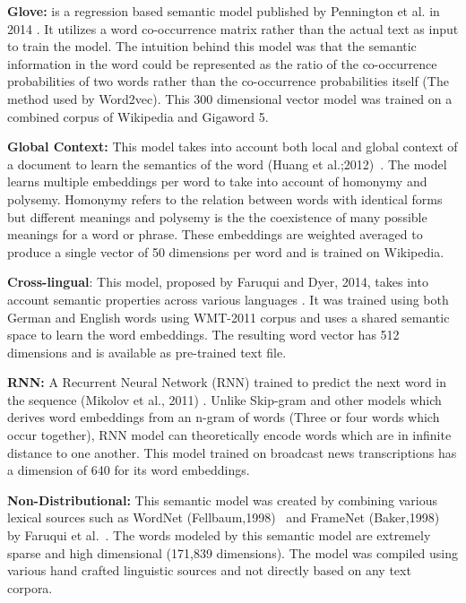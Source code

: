 \noindent \textbf{Glove:} is a regression based semantic model published by Pennington et al. in 2014 \cite{Glove}. It utilizes a word co-occurrence matrix rather than the actual text as input to train the model.  The intuition behind this model was that the semantic information in the word could be represented as the ratio of the co-occurrence probabilities of two words rather
than the co-occurrence probabilities itself (The method used by Word2vec). This  300 dimensional vector model was trained on a combined corpus of Wikipedia and Gigaword 5.

\noindent \textbf{Global Context:} This model takes into account both local
and global context of a document to learn the semantics of the word (Huang et al.;2012)~\cite{GlobalContext}. The model learns multiple embeddings per word to take into account of homonymy  and polysemy. Homonymy refers to the relation between words with identical forms but different meanings and polysemy is the the coexistence of many possible meanings for a
word or phrase. These embeddings are weighted averaged to produce a single vector of 50 dimensions per word and is trained on Wikipedia.


\noindent \textbf{Cross-lingual}: This model, proposed by Faruqui
and Dyer, 2014, takes into account semantic
properties across various languages \cite{Crosslingual}. It was trained using both German and English words using WMT-2011 corpus and uses a shared semantic space to learn the word embeddings. The resulting word vector
has 512 dimensions and is available as pre-trained text file.

\noindent \textbf{RNN:} A Recurrent Neural Network (RNN) trained  to predict the next word in the sequence (Mikolov et
al., 2011) \cite{RNN}. Unlike Skip-gram and other models which derives word
embeddings from an n-gram of words (Three or four words
which occur together), RNN model can theoretically
encode words which are in infinite distance to one another. This model trained on broadcast news transcriptions has a dimension of 640 for its word embeddings.

\noindent \textbf{Non-Distributional:} This semantic model was created
by combining various lexical sources such as
WordNet (Fellbaum,1998)~\cite{wordnet} and FrameNet (Baker,1998)~\cite{FrameNet} by Faruqui et al.~\cite{NonDist}. The words modeled by this semantic model are extremely
sparse and high dimensional (171,839 dimensions). The model was compiled using various hand crafted linguistic
sources and not directly based on any text corpora.

